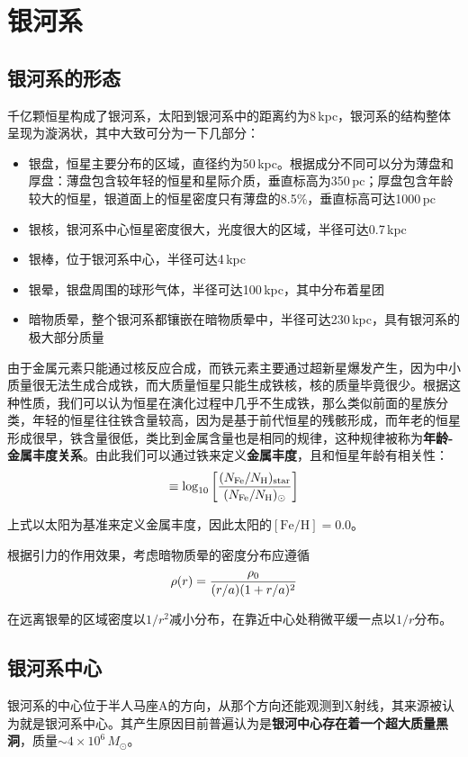 \chapter{银河系}
\section{银河系的形态}
千亿颗恒星构成了银河系，太阳到银河系中的距离约为8\,kpc，银河系的结构整体呈现为漩涡状，其中大致可分为一下几部分：
\begin{itemize}
  \item 银盘，恒星主要分布的区域，直径约为50\,kpc。根据成分不同可以分为薄盘和厚盘：薄盘包含较年轻的恒星和星际介质，垂直标高为350\,pc；厚盘包含年龄较大的恒星，银道面上的恒星密度只有薄盘的8.5\%，垂直标高可达1000\,pc
  \item 银核，银河系中心恒星密度很大，光度很大的区域，半径可达0.7\,kpc
  \item 银棒，位于银河系中心，半径可达4\,kpc
  \item 银晕，银盘周围的球形气体，半径可达100\,kpc，其中分布着星团
  \item 暗物质晕，整个银河系都镶嵌在暗物质晕中，半径可达230\,kpc，具有银河系的极大部分质量
\end{itemize}

由于金属元素只能通过核反应合成，而铁元素主要通过超新星爆发产生，因为中小质量很无法生成合成铁，而大质量恒星只能生成铁核，核的质量毕竟很少。根据这种性质，我们可以认为恒星在演化过程中几乎不生成铁，那么类似前面的星族分类，年轻的恒星往往铁含量较高，因为是基于前代恒星的残骸形成，而年老的恒星形成很早，铁含量很低，类比到金属含量也是相同的规律，这种规律被称为\textbf{年龄-金属丰度关系}。由此我们可以通过铁来定义\textbf{金属丰度}，且和恒星年龄有相关性：
\begin{equation}
  [\mathrm{Fe/H}]\equiv \log_{10}\left[{(N_\mathrm{Fe}/N_\mathrm{H})_\mathrm{star}\over (N_\mathrm{Fe}/N_\mathrm{H})_\odot}\right]
\end{equation}

上式以太阳为基准来定义金属丰度，因此太阳的$[\mathrm{Fe/H}]=0.0$。

根据引力的作用效果，考虑暗物质晕的密度分布应遵循
\begin{equation}
  \rho(r)={\rho_0 \over (r/a)(1+r/a)^2}
\end{equation}

在远离银晕的区域密度以$1/r^2$减小分布，在靠近中心处稍微平缓一点以$1/r$分布。

\section{银河系中心}
银河系的中心位于半人马座A的方向，从那个方向还能观测到X射线，其来源被认为就是银河系中心。其产生原因目前普遍认为是\textbf{银河中心存在着一个超大质量黑洞}，质量$\sim 4\times 10^6\,M_\odot$。